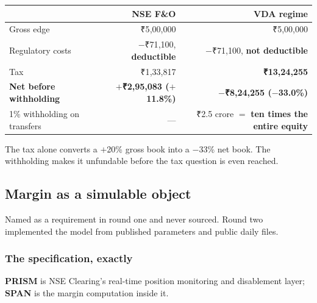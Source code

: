 \documentclass[11pt,a4paper]{article}
\newcommand{\rs}{₹}
\begin{document}
\begin{center}
\begin{tabular}{@{}lrr@{}}
\toprule
& \textbf{NSE F\&O} & \textbf{VDA regime} \\
\midrule
Gross edge & \rs 5{,}00{,}000 & \rs 5{,}00{,}000 \\
Regulatory costs & $-$\rs 71{,}100, \textbf{deductible} & $-$\rs 71{,}100, \textbf{not deductible} \\
Tax & \rs 1{,}33{,}817 & \textbf{\rs 13{,}24{,}255} \\
\textbf{Net before withholding} & \textbf{$+$\rs 2{,}95{,}083 ($+$11.8\%)} & \textbf{$-$\rs 8{,}24{,}255 ($-$33.0\%)} \\
1\% withholding on transfers & --- & \rs 2.5 crore $=$ \textbf{ten times the entire equity} \\
\bottomrule
\end{tabular}
\end{center}

The tax alone converts a $+$20\% gross book into a $-$33\% net book. The
withholding makes it unfundable before the tax question is even reached.

\subsection{Margin as a simulable object}
\label{sec:margin}

Named as a requirement in round one and never sourced. Round two implemented the
model from published parameters and public daily files.

\subsubsection{The specification, exactly}

\textbf{PRISM} is NSE Clearing's real-time position monitoring and disablement
layer; \textbf{SPAN} is the margin computation inside it.
\end{document}

